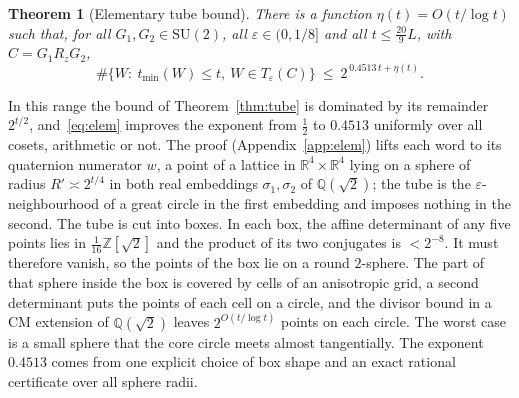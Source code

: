\documentclass[aps,prx,twocolumn,superscriptaddress,nofootinbib,longbibliography]{revtex4-2}
\theoremstyle{plain}
\newtheorem{theorem}{Theorem}
\theoremstyle{definition}
\theoremstyle{remark}
\newcommand{\Z}{\mathbb{Z}}
\newcommand{\Q}{\mathbb{Q}}
\newcommand{\R}{\mathbb{R}}
\newcommand{\SU}{\mathrm{SU}(2)}
\begin{document}
\begin{theorem}[Elementary tube bound]\label{thm:elem}
There is a function $\eta(t)=O(t/\log t)$ such that, for all $G_1,G_2\in\SU$, all $\varepsilon\in(0,1/8]$ and all $t\le\tfrac{20}9L$, with $C=G_1R_zG_2$,
\begin{equation}\label{eq:elem}
\#\{W:\ t_{\min}(W)\le t,\ W\in T_\varepsilon(C)\}\ \le\ 2^{\,0.4513\,t+\eta(t)} .
\end{equation}
\end{theorem}
In this range the bound of Theorem~\ref{thm:tube} is dominated by its remainder $2^{t/2}$, and~\eqref{eq:elem} improves the exponent from $\tfrac12$ to $0.4513$ uniformly over all cosets, arithmetic or not. The proof (Appendix~\ref{app:elem}) lifts each word to its quaternion numerator $w$, a point of a lattice in $\R^4\times\R^4$ lying on a sphere of radius $R'\asymp2^{t/4}$ in both real embeddings $\sigma_1,\sigma_2$ of $\Q(\sqrt2)$; the tube is the $\varepsilon$-neighbourhood of a great circle in the first embedding and imposes nothing in the second. The tube is cut into boxes. In each box, the affine determinant of any five points lies in $\tfrac1{16}\Z[\sqrt2]$ and the product of its two conjugates is $<2^{-8}$. It must therefore vanish, so the points of the box lie on a round $2$-sphere. The part of that sphere inside the box is covered by cells of an anisotropic grid, a second determinant puts the points of each cell on a circle, and the divisor bound in a CM extension of $\Q(\sqrt2)$ leaves $2^{O(t/\log t)}$ points on each circle. The worst case is a small sphere that the core circle meets almost tangentially. The exponent $0.4513$ comes from one explicit choice of box shape and an exact rational certificate over all sphere radii.
\end{document}
